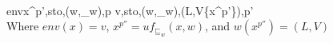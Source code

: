 \\[0.2cm]
	\inference[]{}
	{env\vdash \left\langle x^{p'},sto,(w,\sqsubseteq_w),p \right\rangle \rightarrow \left\langle v,sto,(w,\sqsubseteq_w),(L,V\cup\{x^{p'}\}),p' \right\rangle}\\[0.3cm]
	Where $env(x)=v$, $x^{p''}=uf_{\sqsubseteq_w}(x,w)$, and $w(x^{p''})=(L,V)$
